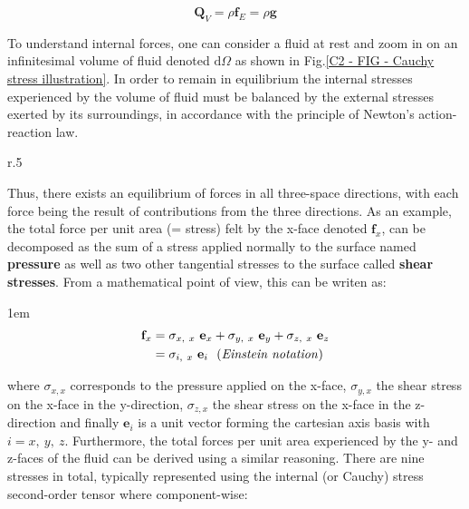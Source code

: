 \begin{equation}
	\mathbf{Q}_V = \rho \mathbf{f}_E = \rho \mathbf{g}
	\label{C2 - EQ - External volumic forces}
\end{equation}
\vspace{-0.3em}

To understand internal forces, one can consider a fluid at rest and zoom in on an infinitesimal volume of fluid denoted $\mathrm{d}\Omega$ as shown in Fig.\ref{C2 - FIG - Cauchy stress illustration}. In order to remain in equilibrium the internal stresses experienced by the volume of fluid must be balanced by the external stresses exerted by its surroundings, in accordance with the principle of Newton's action-reaction law.\\

\begin{wrapfigure}[15]{r}{.5\linewidth}
	\vspace{-7mm}
    \centering
    \resizebox{\linewidth}{0.75\linewidth}{}
    \caption{Balance of forces for an infinitesimal volume of fluid $\mathrm{d}\Omega$ at equilibrium with its surrounding in a resting fluid.}
    \label{C2 - FIG - Cauchy stress illustration}
\end{wrapfigure}

Thus, there exists an equilibrium of forces in all three-space directions, with each force being the result of contributions from the three directions. As an example, the total force per unit area (= stress) felt by the x-face denoted $\mathbf{f}_x$, can be decomposed as the sum of a stress applied normally to the surface named \textbf{pressure} as well as two other tangential stresses to the surface called \textbf{shear stresses}.  From a mathematical point of view, this can be writen as:

\begin{spreadlines}{1em}
\begin{align*}
\mathbf{f}_x & = \sigma_{x, \ x} \ \mathbf{e}_x + \sigma_{y, \ x} \ \mathbf{e}_y + \sigma_{z, \ x} \ \mathbf{e}_z  \\
& = \sigma_{i, \ x} \ \mathbf{e}_i \ \ \text{(\textit{Einstein notation})}
\end{align*}
\end{spreadlines}
\vspace{0.3em}

where $\sigma_{x, x}$ corresponds to the pressure applied on the x-face, $\sigma_{y, x}$ the shear stress on the x-face in the y-direction, $\sigma_{z, x}$  the shear stress on the x-face in the z-direction and finally $\mathbf{e}_i$ is a unit vector forming the cartesian axis basis with $i = x, \ y, \ z$. Furthermore, the total forces per unit area experienced by the y- and z-faces of the fluid can be derived using a similar reasoning. There are nine stresses in total, typically represented using the internal (or Cauchy) stress second-order tensor where component-wise:

